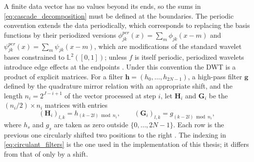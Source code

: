 A finite data vector has no values beyond its ends, so the sums in
\eqref{eq:cascade_decomposition} must be defined at the boundaries. The
periodic convention extends the data periodically, which corresponds to
replacing the basis functions by their periodized versions
$\phi^{per}_{jk}(x) = \sum_m\phi_{jk}(x-m)$ and
$\psi^{per}_{jk}(x) = \sum_m\psi_{jk}(x-m)$, which are modifications of the standard wavelet bases constrained to
$\mathbb{L}^2([0,1])$; unless $f$ is itself periodic, periodized wavelets
introduce edge effects at the endpoints \cite[Sec.~5.6]{vidakovic1999}. Under this convention the DWT is a
product of explicit matrices. For a filter $\mathbf{h} = (h_0,\dots,
h_{2N-1})$, a high-pass filter $\mathbf{g}$ defined by the quadrature
mirror relation with an appropriate shift, and the length
$n_i = 2^{J-i+1}$ of the vector processed at step $i$, let $\mathbf{H}_i$ and $\mathbf{G}_i$ be the
$(n_i/2)\times n_i$ matrices with entries
\begin{equation}
(\mathbf{H}_i)_{l,k} = h_{(k-2l)\bmod n_i},\qquad
(\mathbf{G}_i)_{l,k} = g_{(k-2l)\bmod n_i},
\label{eq:circulant_filters}
\end{equation}
where $h_s$ and $g_s$ are taken as zero outside $\{0,\dots,2N-1\}$. Each row
is the previous one circularly shifted two positions to the right
\cite[Sec.~4.3.1]{vidakovic1999}. The indexing in \eqref{eq:circulant_filters}
is the one used in the implementation of this thesis; it differs from that of
\cite[Sec.~4.3.1]{vidakovic1999} only by a shift.

